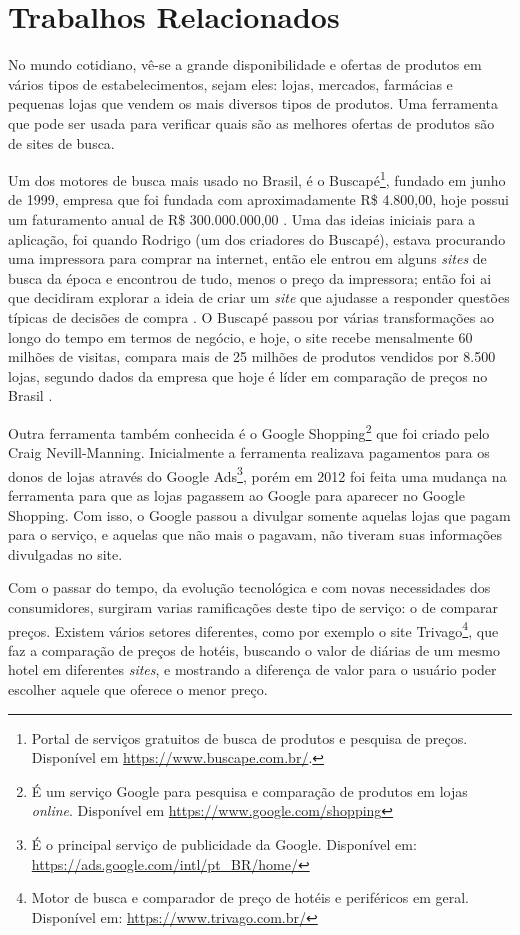 \section{Trabalhos Relacionados}
\label{sec:trabalhos-relacionados}

No mundo cotidiano, vê-se a grande disponibilidade e ofertas de produtos em vários tipos de estabelecimentos, sejam eles: lojas, mercados, farmácias e pequenas lojas que vendem os mais diversos tipos de produtos. Uma ferramenta que pode ser usada para verificar quais são as melhores ofertas de produtos são de sites de busca.

Um dos motores de busca mais usado no Brasil, é o Buscapé\footnote{Portal de serviços gratuitos de busca de produtos e pesquisa de preços. Disponível em \url{https://www.buscape.com.br/}.}, fundado em junho de 1999, empresa que foi fundada com aproximadamente R\$ 4.800,00, hoje possui um faturamento anual de R\$ 300.000.000,00 \cite{EmídiaFelipe2017BUSCAPÉ}. Uma das ideias iniciais para a aplicação, foi quando Rodrigo (um dos criadores do Buscapé), estava procurando uma impressora para comprar na internet, então ele entrou em alguns \textit{sites} de busca da época e encontrou de tudo, menos o preço da impressora; então foi ai que decidiram explorar a ideia de criar um \textit{site} que ajudasse a responder questões típicas de decisões de compra \cite{Arruda2011Buscapé}. O Buscapé passou por várias transformações ao longo do tempo em termos de negócio, e hoje, o site recebe mensalmente 60 milhões de visitas, compara mais de 25 milhões de produtos vendidos por 8.500 lojas, segundo dados da empresa que hoje é líder em comparação de preços no Brasil \cite{HELOÍSA2017Startups}.

Outra ferramenta também conhecida é o Google Shopping\footnote{É um serviço Google para pesquisa e comparação de produtos em lojas \textit{online}. Disponível em \url{https://www.google.com/shopping}} que foi criado pelo Craig Nevill-Manning. Inicialmente a ferramenta realizava pagamentos para os donos de lojas através do Google Ads\footnote{É o principal serviço de publicidade da Google. Disponível em: \url{https://ads.google.com/intl/pt_BR/home/}}, porém em 2012 foi feita uma mudança na ferramenta para que as lojas pagassem ao Google para aparecer no Google Shopping. Com isso, o Google passou a divulgar somente aquelas lojas que pagam para o serviço, e aquelas que não mais o pagavam, não tiveram suas informações divulgadas no site.

Com o passar do tempo, da evolução tecnológica e com novas necessidades dos consumidores, surgiram varias ramificações deste tipo de serviço: o de comparar preços. Existem vários setores diferentes, como por exemplo o site Trivago\footnote{Motor de busca e comparador de preço de hotéis e periféricos em geral. Disponível em: \url{https://www.trivago.com.br/}}, que faz a comparação de preços de hotéis, buscando o valor de diárias de um mesmo hotel em diferentes \textit{sites}, e mostrando a diferença de valor para o usuário poder escolher aquele que oferece o menor preço.

